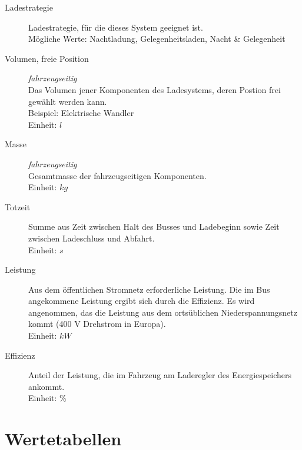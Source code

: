 \begin{description}
	\item [Ladestrategie] Ladestrategie, für die dieses System geeignet ist.\\
	Mögliche Werte: Nachtladung, Gelegenheitsladen, Nacht \& Gelegenheit
	\item [Volumen, freie Position] \emph{fahrzeugseitig}\\
	Das Volumen jener Komponenten des Ladesystems, deren Postion frei gewählt werden kann.\\
	Beispiel: Elektrische Wandler\\
	Einheit: $l$
	\item [Masse] \emph{fahrzeugseitig}\\
	Gesamtmasse der fahrzeugseitigen Komponenten.\\
	Einheit: $kg$
	\item [Totzeit]
	Summe aus Zeit zwischen Halt des Busses und Ladebeginn sowie Zeit zwischen Ladeschluss und Abfahrt.\\
	Einheit: $s$
	\item [Leistung]
	Aus dem öffentlichen Stromnetz erforderliche Leistung. Die im Bus angekommene Leistung ergibt sich durch die Effizienz. Es wird angenommen, das die Leistung aus dem ortsüblichen Niederspannungsnetz kommt (400 V Drehstrom in Europa).\\
	Einheit: $kW$
	\item [Effizienz]
	Anteil der Leistung, die im Fahrzeug am Laderegler des Energiespeichers ankommt.\\
	Einheit: \%
\end{description}


\section{Wertetabellen}
\label{sec_tabellen_ladesysteme}
\FloatBarrier
